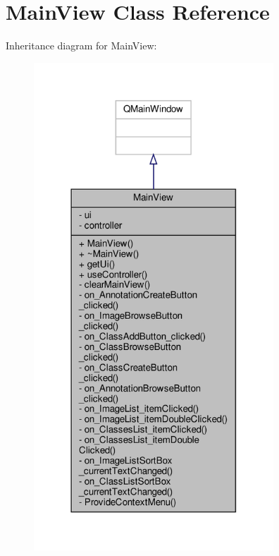 \hypertarget{classMainView}{}\section{Main\+View Class Reference}
\label{classMainView}


Inheritance diagram for Main\+View\+:\nopagebreak
\begin{figure}[H]
\begin{center}
\leavevmode
\includegraphics[width=255pt]{classMainView__inherit__graph}
\end{center}
\end{figure}


